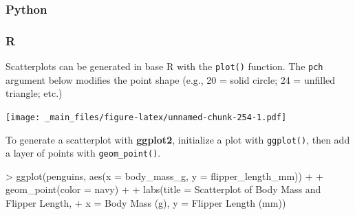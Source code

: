 \documentclass[
]{book}
\newenvironment{Shaded}{\begin{snugshade}}{\end{snugshade}}
\newcommand{\AttributeTok}[1]{\textcolor[rgb]{0.77,0.63,0.00}{#1}}
\newcommand{\DecValTok}[1]{\textcolor[rgb]{0.00,0.00,0.81}{#1}}
\newcommand{\FunctionTok}[1]{\textcolor[rgb]{0.00,0.00,0.00}{#1}}
\newcommand{\NormalTok}[1]{#1}
\newcommand{\SpecialCharTok}[1]{\textcolor[rgb]{0.00,0.00,0.00}{#1}}
\newcommand{\StringTok}[1]{\textcolor[rgb]{0.31,0.60,0.02}{#1}}
\begin{document}
\hypertarget{python-41}{%
\subsubsection*{Python}\label{python-41}}

\hypertarget{r-41}{%
\subsubsection*{R}\label{r-41}}

Scatterplots can be generated in base R with the \texttt{plot()} function. The \texttt{pch} argument below modifies the point shape (e.g., 20 = solid circle; 24 = unfilled triangle; etc.)

\begin{Shaded}
\end{Shaded}

\texttt{[image: \_main\_files/figure-latex/unnamed-chunk-254-1.pdf]}

To generate a scatterplot with \textbf{ggplot2}, initialize a plot with \texttt{ggplot()}, then add a layer of points with \texttt{geom\_point()}.

\begin{Shaded}
\begin{Highlighting}[]
\SpecialCharTok{\textgreater{}} \FunctionTok{ggplot}\NormalTok{(penguins, }\FunctionTok{aes}\NormalTok{(}\AttributeTok{x =}\NormalTok{ body\_mass\_g, }\AttributeTok{y =}\NormalTok{ flipper\_length\_mm)) }\SpecialCharTok{+}
\SpecialCharTok{+}   \FunctionTok{geom\_point}\NormalTok{(}\AttributeTok{color =} \StringTok{\textquotesingle{}navy\textquotesingle{}}\NormalTok{) }\SpecialCharTok{+}
\SpecialCharTok{+}   \FunctionTok{labs}\NormalTok{(}\AttributeTok{title =} \StringTok{\textquotesingle{}Scatterplot of Body Mass and Flipper Length\textquotesingle{}}\NormalTok{, }
\SpecialCharTok{+}        \AttributeTok{x =} \StringTok{\textquotesingle{}Body Mass (g)\textquotesingle{}}\NormalTok{, }\AttributeTok{y =} \StringTok{\textquotesingle{}Flipper Length (mm)\textquotesingle{}}\NormalTok{)}
\end{Highlighting}
\end{Shaded}
\end{document}
